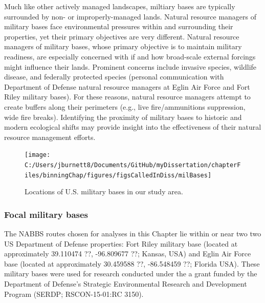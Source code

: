 \documentclass[12pt,twoside]{reedthesis}
\begin{document}
Much like other actively managed landscapes, miltiary bases are typically surrounded by non- or improperly-managed lands. Natural resource managers of military bases face environmental pressures within and surrounding their properties, yet their primary objectives are very different. Natural resource managers of military bases, whose primary objective is to maintain military readiness, are especially concerned with if and how broad-scale external forcings might influence their lands. Prominent concerns include invasive species, wildlife disease, and federally protected species (personal communication with Department of Defense natural resource managers at Eglin Air Force and Fort Riley military bases). For these reasons, natural resource managers attempt to create buffers along their perimeters (e.g., live fire/ammunitions suppression, wide fire breaks). Identifying the proximity of military bases to historic and modern ecological shifts may provide insight into the effectiveness of their natural resource management efforts.
\begin{figure}

{\centering \texttt{[image: C:/Users/jburnett8/Documents/GitHub/myDissertation/chapterFiles/binningChap/figures/figsCalledInDiss/milBases]} 

}

\caption{Locations of U.S. military bases in our study area.}\label{fig:milBases}
\end{figure}
\hypertarget{focal-military-bases}{%
\subsubsection{Focal military bases}\label{focal-military-bases}}

The NABBS routes chosen for analyses in this Chapter lie within or near two two US Department of Defense properties: Fort Riley military base (located at approximately 39.110474 ??, -96.809677 ??; Kansas, USA) and Eglin Air Force base (located at approximately 30.459588 ??, -86.548459 ??; Florida USA). These military bases were used for research conducted under the a grant funded by the Department of Defense's Strategic Environmental Research and Development Program (SERDP; RSCON-15-01:RC 3150).
\end{document}
